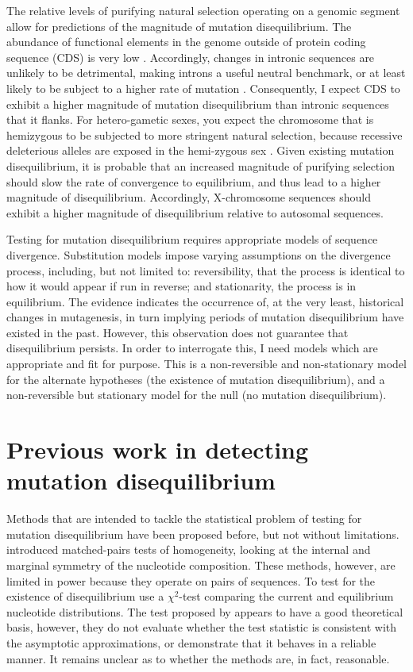 The relative levels of purifying natural selection operating on a genomic segment allow for predictions of the magnitude of mutation disequilibrium. The abundance of functional elements in the genome outside of protein coding sequence (CDS) is very low \citep{Graur2013OnENCODE}. Accordingly, changes in intronic sequences are unlikely to be detrimental, making introns a useful neutral benchmark, or at least likely to be subject to a higher rate of mutation \citep{Graur2013OnENCODE}. Consequently, I expect CDS to exhibit a higher magnitude of mutation disequilibrium than intronic sequences that it flanks. For hetero-gametic sexes, you expect the chromosome that is hemizygous to be subjected to more stringent natural selection, because recessive deleterious alleles are exposed in the hemi-zygous sex \citep{Charlesworth1987TheAutosomes}. Given existing mutation disequilibrium, it is probable that an increased magnitude of purifying selection should slow the rate of convergence to equilibrium, and thus lead to a higher magnitude of disequilibrium. Accordingly, X-chromosome sequences should exhibit a higher magnitude of disequilibrium relative to autosomal sequences. 

Testing for mutation disequilibrium requires appropriate \gls{models} of sequence divergence. \Gls{Substitution models} impose varying assumptions on the divergence process, including, but not limited to: reversibility, that the process is identical to how it would appear if run in reverse; and \gls{stationarity}, the process is in \gls{equilibrium}. The evidence indicates the occurrence of, at the very least, historical changes in mutagenesis, in turn implying periods of mutation disequilibrium have existed in the past. However, this observation does not guarantee that disequilibrium persists. In order to interrogate this, I need models which are appropriate and fit for purpose. This is a non-reversible and non-stationary model for the alternate hypotheses (the existence of mutation disequilibrium), and a non-reversible but stationary model for the null (no mutation disequilibrium). 

\section{Previous work in detecting mutation disequilibrium}

Methods that are intended to tackle the statistical problem of testing for mutation disequilibrium have been proposed before, but not without limitations. \cite{Ababneh2006Matched-pairsSequences} introduced matched-pairs tests of homogeneity, looking at the internal and marginal symmetry of the nucleotide composition. These methods, however, are limited in power because they operate on pairs of sequences. To test for the existence of disequilibrium \cite{Squartini2008QuantifyingProcess} use a $\chi^2$-test comparing the current and equilibrium nucleotide distributions. The test proposed by \cite{Squartini2008QuantifyingProcess} appears to have a good theoretical basis, however, they do not evaluate whether the test statistic is consistent with the asymptotic approximations, or demonstrate that it behaves in a reliable manner. It remains unclear as to whether the methods are, in fact, reasonable. 

